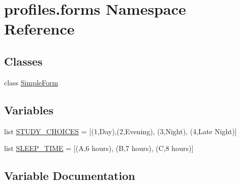 \hypertarget{namespaceprofiles_1_1forms}{}\section{profiles.\+forms Namespace Reference}
\label{namespaceprofiles_1_1forms}
\subsection*{Classes}
\begin{DoxyCompactItemize}
\item 
class \hyperlink{classprofiles_1_1forms_1_1SimpleForm}{Simple\+Form}
\end{DoxyCompactItemize}
\subsection*{Variables}
\begin{DoxyCompactItemize}
\item 
list \hyperlink{namespaceprofiles_1_1forms_ad18051c2e7ed6d9b9a9a01f28dca7e06}{S\+T\+U\+D\+Y\+\_\+\+C\+H\+O\+I\+C\+ES} = \mbox{[}(\textquotesingle{}1\textquotesingle{},\textquotesingle{}Day\textquotesingle{}),(\textquotesingle{}2\textquotesingle{},\textquotesingle{}Evening\textquotesingle{}), (\textquotesingle{}3\textquotesingle{},\textquotesingle{}Night\textquotesingle{}), (\textquotesingle{}4\textquotesingle{},\textquotesingle{}Late Night\textquotesingle{})\mbox{]}
\item 
list \hyperlink{namespaceprofiles_1_1forms_acb9c66af99ba661b6011aac17a7cc825}{S\+L\+E\+E\+P\+\_\+\+T\+I\+ME} = \mbox{[}(\textquotesingle{}A\textquotesingle{},\textquotesingle{}6 hours\textquotesingle{}), (\textquotesingle{}B\textquotesingle{},\textquotesingle{}7 hours\textquotesingle{}), (\textquotesingle{}C\textquotesingle{},\textquotesingle{}8 hours\textquotesingle{})\mbox{]}
\end{DoxyCompactItemize}


\subsection{Variable Documentation}
